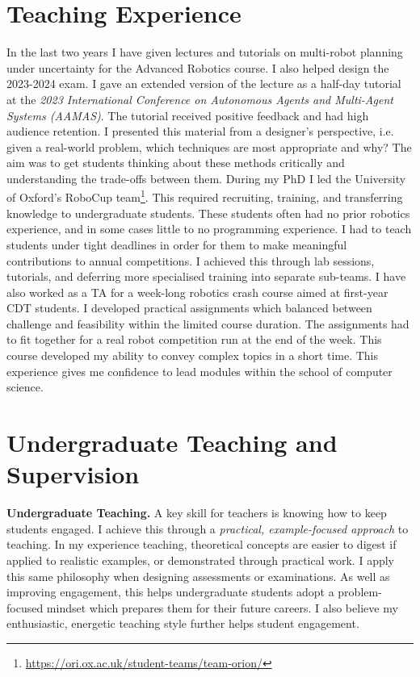 \documentclass[12pt]{article}
\begin{document}
\section*{Teaching Experience}

In the last two years I have given lectures and tutorials on multi-robot planning under uncertainty for the Advanced Robotics course.
%
I also helped design the 2023-2024 exam.
%
I gave an extended version of the lecture as a half-day tutorial at the \emph{2023 International Conference on Autonomous Agents and Multi-Agent Systems (AAMAS)}.
%
The tutorial received positive feedback and had high audience retention.
%
I presented this material from a designer's perspective, i.e. given a real-world problem, which techniques are most appropriate and why?
%
The aim was to get students thinking about these methods critically and understanding the trade-offs between them.
%
During my PhD I led the University of Oxford's RoboCup team\footnote{\url{https://ori.ox.ac.uk/student-teams/team-orion/}}.
%
This required recruiting, training, and transferring knowledge to undergraduate students.
%
These students often had no prior robotics experience, and in some cases little to no programming experience.
%
I had to teach students under tight deadlines in order for them to make meaningful contributions to annual competitions. 
%
I achieved this through lab sessions, tutorials, and deferring more specialised training into separate sub-teams.
%
%
I have also worked as a TA for a week-long robotics crash course aimed at first-year CDT students.
%
I developed practical assignments which balanced between challenge and feasibility within the limited course duration.
%
The assignments had to fit together for a real robot competition run at the end of the week.
%
This course developed my ability to convey complex topics in a short time.
%
This experience gives me confidence to lead modules within the school of computer science.

\section*{Undergraduate Teaching and Supervision}

\vspace*{1ex}\noindent\textbf{Undergraduate Teaching.} A key skill for teachers is knowing how to keep students engaged.
%
I achieve this through a \emph{practical, example-focused approach} to teaching.
%
In my experience teaching, theoretical concepts are easier to digest if applied to realistic examples, or demonstrated through practical work.
%
I apply this same philosophy when designing assessments or examinations.
%
As well as improving engagement, this helps undergraduate students adopt a problem-focused mindset which prepares them for their future careers.
%
I also believe my enthusiastic, energetic teaching style further helps student engagement.
\end{document}
